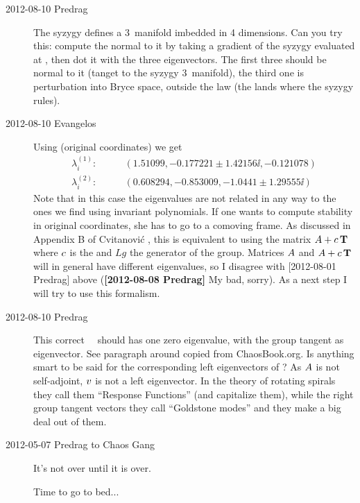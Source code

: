 \begin{description}
\item[2012-08-10 Predrag] The syzygy defines a 3\dmn\ manifold imbedded
in 4 dimensions. Can you try this: compute the normal to it by taking a
gradient of the syzygy evaluated at , then dot it with the
three eigenvectors. The first three should be normal to it (tanget to the
syzygy 3\dmn\ manifold), the third one is perturbation into Bryce space,
outside the law (the lands where the syzygy rules).

\item[2012-08-10 Evangelos]
Using  (original coordinates) we get
\begin{align}
  \lambda^{(1)}_i:\qquad  & (1.51099, -0.177221 \pm 1.42156 \ii, -0.121078)\\
  \lambda^{(2)}_i:\qquad  & (0.608294, -0.853009, -1.0441 \pm  1.29555 \ii)
\end{align}
Note that in this case the eigenvalues are not related in any way to the
ones we find using invariant polynomials. If one wants to compute
stability in original coordinates, she has to go to a comoving frame. As
discussed in Appendix B of Cvitanovi\'c \etal{}, this is
equivalent to using the matrix $A+c\, \mathbf{T}$ where $c$ is
the {\phaseVel} and $Lg$ the generator of the group. Matrices $A$ and
$A+c\, \mathbf{T}$ will in general have different eigenvalues, so I
disagree with [2012-08-01 Predrag] above
({\bf [2012-08-08 Predrag]} My bad, sorry).
As a next step I will try to use this formalism.

\item[2012-08-10 Predrag]                   \toCB
This correct \reqv\ \stabmat\ should has one zero eigenvalue, with the
group tangent as eigenvector. See paragraph around 
copied from ChaosBook.org. Is anything smart to be said for the
corresponding left eigenvectors of ? As $A$ is not
self-adjoint, $v$ is not a left eigenvector. In the theory of rotating
spirals they call them ``Response Functions'' (and
capitalize them), while the right group tangent vectors they call
``Goldstone modes'' and they make a big deal out of them.


\item[2012-05-07  Predrag to Chaos Gang] It's not over until it is over.

Time to go to bed...
\end{description}
